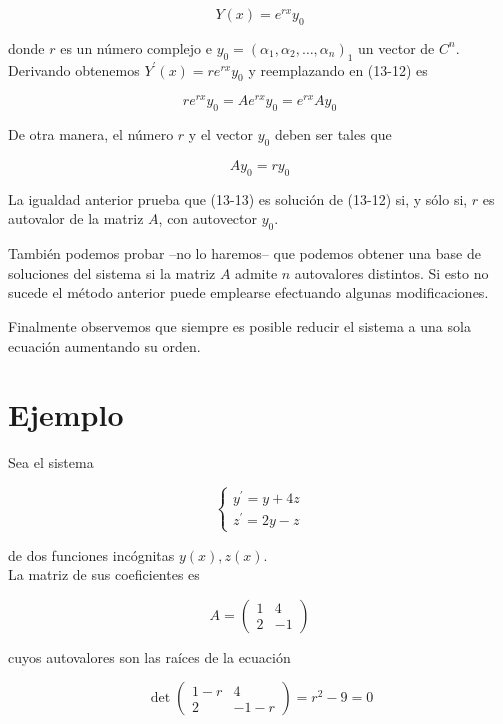 \documentclass[10pt]{article}
\theoremstyle{plain}
\theoremstyle{definition}
\theoremstyle{remark}
\begin{document}
\begin{equation*}
Y(x)=e^{r x} y_{0} \tag{13-13}
\end{equation*}


donde $r$ es un número complejo e $y_{0}=\left(\alpha_{1}, \alpha_{2}, \ldots, \alpha_{n}\right)_{1}$ un vector de $C^{n}$.\\
Derivando obtenemos $Y^{\prime}(x)=r e^{r x} y_{0}$ y reemplazando en (13-12) es

$$
r e^{r x} y_{0}=A e^{r x} y_{0}=e^{r x} A y_{0}
$$

De otra manera, el número $r$ y el vector $y_{0}$ deben ser tales que


\begin{equation*}
A y_{0}=r y_{0} \tag{13-14}
\end{equation*}


La igualdad anterior prueba que (13-13) es solución de (13-12) si, y sólo si, $r$ es autovalor de la matriz $A$, con autovector $y_{0}$.

También podemos probar --no lo haremos-- que podemos obtener una base de soluciones del sistema si la matriz $A$ admite $n$ autovalores distintos. Si esto no sucede el método anterior puede emplearse efectuando algunas modificaciones.

Finalmente observemos que siempre es posible reducir el sistema a una sola ecuación aumentando su orden.

\section*{Ejemplo}
Sea el sistema

$$
\left\{\begin{array}{l}
y^{\prime}=y+4 z \\
z^{\prime}=2 y-z
\end{array}\right.
$$

de dos funciones incógnitas $y(x), z(x)$.\\
La matriz de sus coeficientes es

$$
A=\left(\begin{array}{cc}
1 & 4 \\
2 & -1
\end{array}\right)
$$

cuyos autovalores son las raíces de la ecuación

$$
\operatorname{det}\left(\begin{array}{cc}
1-r & 4 \\
2 & -1-r
\end{array}\right)=r^{2}-9=0
$$
\end{document}
